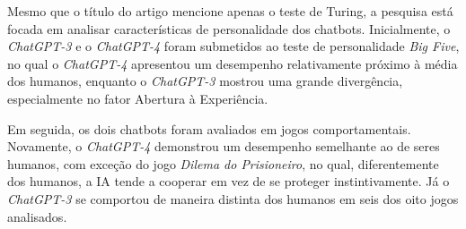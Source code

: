 \documentclass[a4paper,12pt]{article}
\begin{document}
	
	
	Mesmo que o título do artigo mencione apenas o teste de Turing, a pesquisa está focada em analisar características de personalidade dos chatbots. Inicialmente, o \textit{ChatGPT-3} e o \textit{ChatGPT-4} foram submetidos ao teste de personalidade \textit{Big Five}, no qual o \textit{ChatGPT-4} apresentou um desempenho relativamente próximo à média dos humanos, enquanto o \textit{ChatGPT-3} mostrou uma grande divergência, especialmente no fator Abertura à Experiência.
	
	Em seguida, os dois chatbots foram avaliados em jogos comportamentais. Novamente, o \textit{ChatGPT-4} demonstrou um desempenho semelhante ao de seres humanos, com exceção do jogo \textit{Dilema do Prisioneiro}, no qual, diferentemente dos humanos, a IA tende a cooperar em vez de se proteger instintivamente. Já o \textit{ChatGPT-3} se comportou de maneira distinta dos humanos em seis dos oito jogos analisados.
	
	
\end{document}
